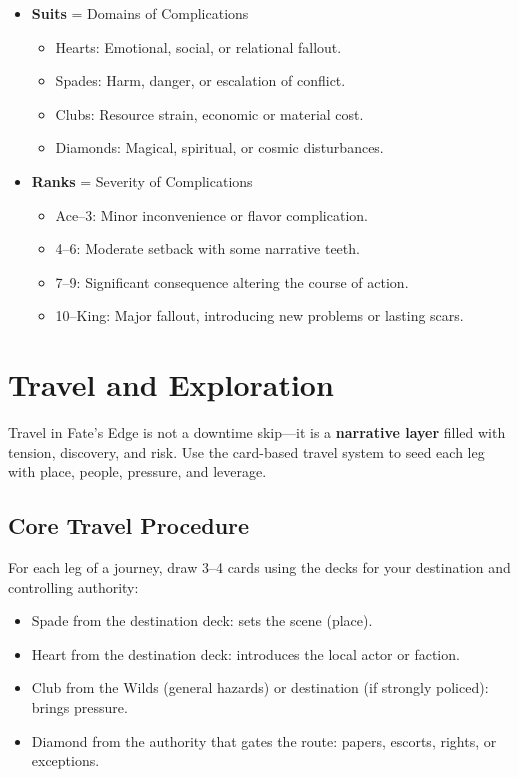\begin{itemize}
    \item \textbf{Suits} = Domains of Complications
    \begin{itemize}
        \item Hearts: Emotional, social, or relational fallout.
        \item Spades: Harm, danger, or escalation of conflict.
        \item Clubs: Resource strain, economic or material cost.
        \item Diamonds: Magical, spiritual, or cosmic disturbances.
    \end{itemize}
    \item \textbf{Ranks} = Severity of Complications
    \begin{itemize}
        \item Ace–3: Minor inconvenience or flavor complication.
        \item 4–6: Moderate setback with some narrative teeth.
        \item 7–9: Significant consequence altering the course of action.
        \item 10–King: Major fallout, introducing new problems or lasting scars.
    \end{itemize}
\end{itemize}

\section*{Travel and Exploration}

Travel in Fate's Edge is not a downtime skip—it is a \textbf{narrative layer} filled with tension, discovery, and risk. Use the card-based travel system to seed each leg with place, people, pressure, and leverage.

\subsection*{Core Travel Procedure}

For each leg of a journey, draw 3–4 cards using the decks for your destination and controlling authority:

\begin{itemize}
    \item Spade from the destination deck: sets the scene (place).
    \item Heart from the destination deck: introduces the local actor or faction.
    \item Club from the Wilds (general hazards) or destination (if strongly policed): brings pressure.
    \item Diamond from the authority that gates the route: papers, escorts, rights, or exceptions.
\end{itemize}

